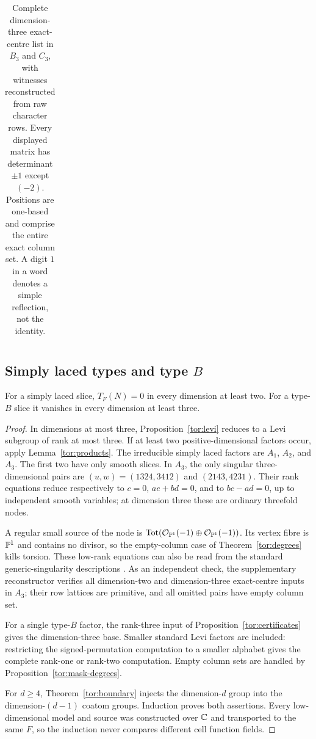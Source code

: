 \begin{table}[tbp]
\begin{tabular}{@{}ccccc@{}}
\bottomrule
\end{tabular}
\caption{Complete dimension-three exact-centre list in $B_3$ and $C_3$, with witnesses reconstructed from raw character rows. Every displayed matrix has determinant $\pm1$ except $(-2)$. Positions are one-based and comprise the entire exact column set. A digit $1$ in a word denotes a simple reflection, not the identity.}\label{tor:bc-table}
\end{table}

\subsection{Simply laced types and type \texorpdfstring{$B$}{B}}
\begin{proposition}\label{tor:simply-laced-b}
For a simply laced slice, $T_F(N)=0$ in every dimension at least two. For a type-$B$ slice it vanishes in every dimension at least three.
\end{proposition}
\begin{proof}
In dimensions at most three, Proposition~\ref{tor:levi} reduces to a Levi subgroup of rank at most three. If at least two positive-dimensional factors occur, apply Lemma~\ref{tor:products}. The irreducible simply laced factors are $A_1$, $A_2$, and $A_3$. The first two have only smooth slices. In $A_3$, the only singular three-dimensional pairs are $(u,w)=(1324,3412)$ and $(2143,4231)$. Their rank equations reduce respectively to $c=0$, $ae+bd=0$, and to $bc-ad=0$, up to independent smooth variables; at dimension three these are ordinary threefold nodes.

A regular small source of the node is $\operatorname{Tot}(\mathcal O_{\mathbb P^1}(-1)\oplus\mathcal O_{\mathbb P^1}(-1))$. Its vertex fibre is $\mathbb P^1$ and contains no divisor, so the empty-column case of Theorem~\ref{tor:degrees} kills torsion. These low-rank equations can also be read from the standard generic-singularity descriptions \cite{Man01a,Cor03,BW03}. As an independent check, the supplementary reconstructor verifies all dimension-two and dimension-three exact-centre inputs in $A_3$; their row lattices are primitive, and all omitted pairs have empty column set.

For a single type-$B$ factor, the rank-three input of Proposition~\ref{tor:certificates} gives the dimension-three base. Smaller standard Levi factors are included: restricting the signed-permutation computation to a smaller alphabet gives the complete rank-one or rank-two computation. Empty column sets are handled by Proposition~\ref{tor:mask-degrees}.

For $d\ge4$, Theorem~\ref{tor:boundary} injects the dimension-$d$ group into the dimension-$(d-1)$ coatom groups. Induction proves both assertions. Every low-dimensional model and source was constructed over $\mathbb C$ and transported to the same $F$, so the induction never compares different cell function fields.
\end{proof}


